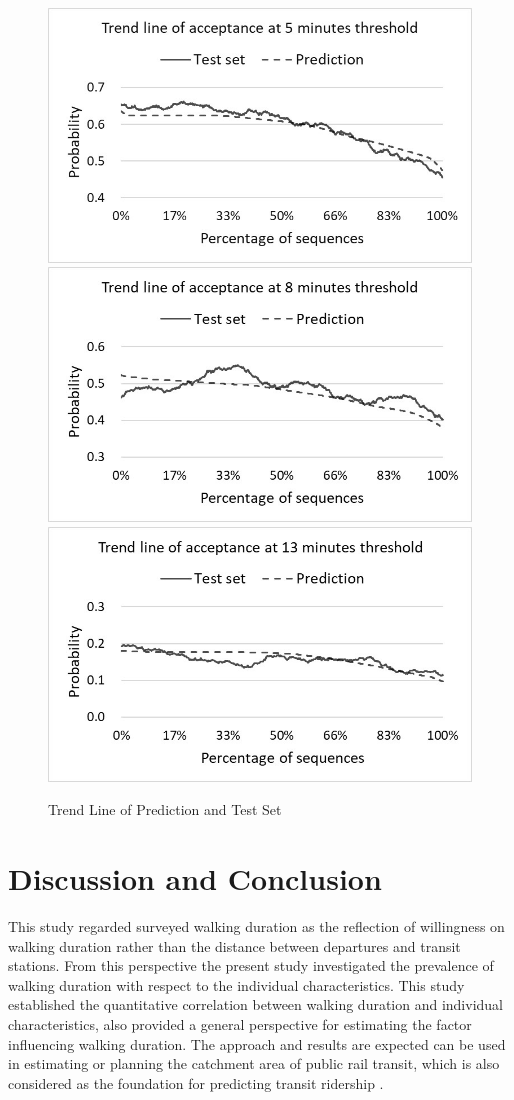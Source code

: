 \documentclass[sustainability,article,submit,moreauthors,pdftex,10pt,a4paper]{Definitions/mdpi}
\begin{document}
\begin{figure}[h]
	\caption{Trend Line of Prediction and Test Set}
	\label{fig:PredictionTrendLine}
	\centering
	\includegraphics[width=0.6\linewidth]{Prediction5Min}\\
	\includegraphics[width=0.6\linewidth]{Prediction8Min}\\
	\includegraphics[width=0.6\linewidth]{Prediction13Min}\\
\end{figure}

\section{Discussion and Conclusion}
This study regarded surveyed walking duration as the reflection of willingness on walking duration rather than the distance between departures and transit stations. From this perspective the present study investigated the prevalence of walking duration with respect to the individual characteristics. This study established the quantitative correlation between walking duration and individual characteristics, also provided a general perspective for estimating the factor influencing walking duration. The approach and results are expected can be used in estimating or planning the catchment area of public rail transit, which is also considered as the foundation for predicting transit ridership \cite{guerra2013half}.
\end{document}
